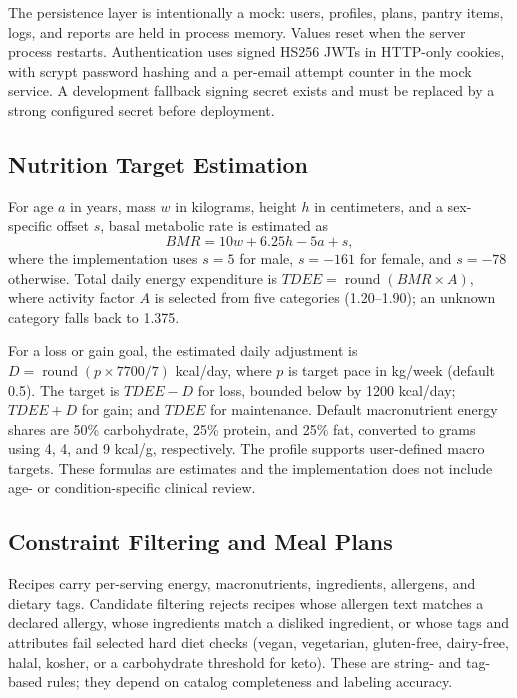 \documentclass[10pt,twocolumn]{article}
\begin{document}
The persistence layer is intentionally a mock: users, profiles, plans, pantry items, logs, and reports are held in process memory. Values reset when the server process restarts. Authentication uses signed HS256 JWTs in HTTP-only cookies, with scrypt password hashing and a per-email attempt counter in the mock service. A development fallback signing secret exists and must be replaced by a strong configured secret before deployment.

\subsection{Nutrition Target Estimation}
For age $a$ in years, mass $w$ in kilograms, height $h$ in centimeters, and a sex-specific offset $s$, basal metabolic rate is estimated as
\begin{equation}
 BMR = 10w + 6.25h - 5a + s,
\end{equation}
where the implementation uses $s=5$ for male, $s=-161$ for female, and $s=-78$ otherwise. Total daily energy expenditure is $TDEE=\operatorname{round}(BMR\times A)$, where activity factor $A$ is selected from five categories (1.20--1.90); an unknown category falls back to 1.375.

For a loss or gain goal, the estimated daily adjustment is $D=\operatorname{round}(p\times7700/7)$ kcal/day, where $p$ is target pace in kg/week (default 0.5). The target is $TDEE-D$ for loss, bounded below by 1200 kcal/day; $TDEE+D$ for gain; and $TDEE$ for maintenance. Default macronutrient energy shares are 50\% carbohydrate, 25\% protein, and 25\% fat, converted to grams using 4, 4, and 9 kcal/g, respectively. The profile supports user-defined macro targets. These formulas are estimates and the implementation does not include age- or condition-specific clinical review.

\subsection{Constraint Filtering and Meal Plans}
Recipes carry per-serving energy, macronutrients, ingredients, allergens, and dietary tags. Candidate filtering rejects recipes whose allergen text matches a declared allergy, whose ingredients match a disliked ingredient, or whose tags and attributes fail selected hard diet checks (vegan, vegetarian, gluten-free, dairy-free, halal, kosher, or a carbohydrate threshold for keto). These are string- and tag-based rules; they depend on catalog completeness and labeling accuracy.
\end{document}
